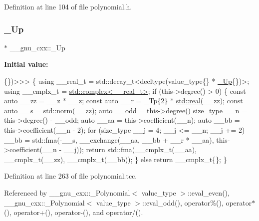 Definition at line 104 of file polynomial.\+h.

\mbox{\label{namespace____gnu__cxx_ab693ea357b6429b331e0bf09f9442385}} 
\subsubsection{\texorpdfstring{\+\_\+\+Up}{\_Up}}
{\footnotesize\ttfamily $\ast$ \+\_\+\+\_\+gnu\+\_\+cxx\+::\+\_\+\+Up}

{\bfseries Initial value\+:}
\begin{DoxyCode}
\{\})>>>
      \{
        \textcolor{keyword}{using} \_\_real\_t = std::decay\_t<decltype(value\_type\{\} * \hyperlink{namespace____gnu__cxx_ab693ea357b6429b331e0bf09f9442385}{\_Up}\{\})>;
        \textcolor{keyword}{using} \_\_cmplx\_t = \hyperlink{classstd_1_1complex}{std::complex<\_\_real\_t>};
        \textcolor{keywordflow}{if} (this->degree() > 0)
          \{
            \textcolor{keyword}{const} \textcolor{keyword}{auto} \_\_zz = \_\_z * \_\_z;
            \textcolor{keyword}{const} \textcolor{keyword}{auto} \_\_r = \_Tp\{2\} * \hyperlink{namespace____gnu__cxx_a2743043701f8e4c87d3f0f06ddb11348}{std::real}(\_\_zz);
            \textcolor{keyword}{const} \textcolor{keyword}{auto} \_\_s = std::norm(\_\_zz);
            \textcolor{keyword}{auto} \_\_odd = this->degree() %
            size\_type \_\_n = this->degree() - \_\_odd;
            \textcolor{keyword}{auto} \_\_aa = this->coefficient(\_\_n);
            \textcolor{keyword}{auto} \_\_bb = this->coefficient(\_\_n - 2);
            \textcolor{keywordflow}{for} (size\_type \_\_j = 4; \_\_j <= \_\_n; \_\_j += 2)
              \_\_bb = std::fma(-\_\_s, \_\_exchange(\_\_aa, \_\_bb + \_\_r * \_\_aa),
                              this->coefficient(\_\_n - \_\_j));
            \textcolor{keywordflow}{return} std::fma(\_\_cmplx\_t(\_\_aa), \_\_cmplx\_t(\_\_zz), \_\_cmplx\_t(\_\_bb));
          \}
        \textcolor{keywordflow}{else}
          \textcolor{keywordflow}{return} \_\_cmplx\_t\{\};
      \}
\end{DoxyCode}


Definition at line 263 of file polynomial.\+tcc.



Referenced by \+\_\+\+\_\+gnu\+\_\+cxx\+::\+\_\+\+Polynomial$<$ value\+\_\+type $>$\+::eval\+\_\+even(), \+\_\+\+\_\+gnu\+\_\+cxx\+::\+\_\+\+Polynomial$<$ value\+\_\+type $>$\+::eval\+\_\+odd(), operator\%(), operator$\ast$(), operator+(), operator-\/(), and operator/().

